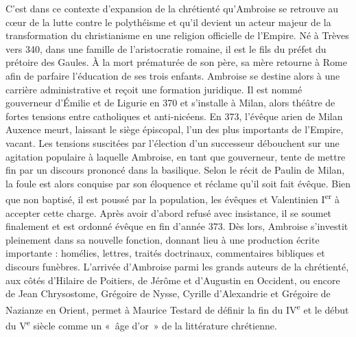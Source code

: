 \bigskip

C’est dans ce contexte d’expansion de la chrétienté qu’Ambroise se retrouve au cœur de la lutte contre le polythéisme et qu’il devient un acteur majeur de la transformation du christianisme en une religion officielle de l’Empire. Né à Trèves vers 340, dans une famille de l’aristocratie romaine, il est le fils du préfet du prétoire des Gaules. À la mort prématurée de son père, sa mère retourne à Rome afin de parfaire l’éducation de ses trois enfants. Ambroise se destine alors à une carrière administrative et reçoit une formation juridique. Il est nommé gouverneur d’Émilie et de Ligurie en 370 et s’installe à Milan, alors théâtre de fortes tensions entre catholiques et anti-nicéens. En 373, l’évêque arien de Milan Auxence meurt, laissant le siège épiscopal, l’un des plus importants de l’Empire, vacant. Les tensions suscitées par l’élection d’un successeur débouchent sur une agitation populaire à laquelle Ambroise, en tant que gouverneur, tente de mettre fin par un discours prononcé dans la basilique. Selon le récit de Paulin de Milan, la foule est alors conquise par son éloquence et réclame qu’il soit fait évêque\autocite{bastiaensen_vite_1975}. Bien que non baptisé, il est poussé par la population, les évêques et Valentinien I\textsuperscript{er} à accepter cette charge. Après avoir d’abord refusé avec insistance, il se soumet finalement et est ordonné évêque en fin d’année 373. Dès lors, Ambroise s’investit pleinement dans sa nouvelle fonction, donnant lieu à une production écrite importante : homélies, lettres, traités doctrinaux, commentaires bibliques et discours funèbres. L’arrivée d’Ambroise parmi les grands auteurs de la chrétienté, aux côtés d’Hilaire de Poitiers, de Jérôme et d’Augustin en Occident, ou encore de Jean Chrysostome, Grégoire de Nysse, Cyrille d’Alexandrie et Grégoire de Nazianze en Orient, permet à Maurice Testard de définir la fin du IV\textsuperscript{e} et le début du V\textsuperscript{e} siècle comme un «~âge d’or~» de la littérature chrétienne\autocite{testard_ambroise_1992}.

\bigskip


